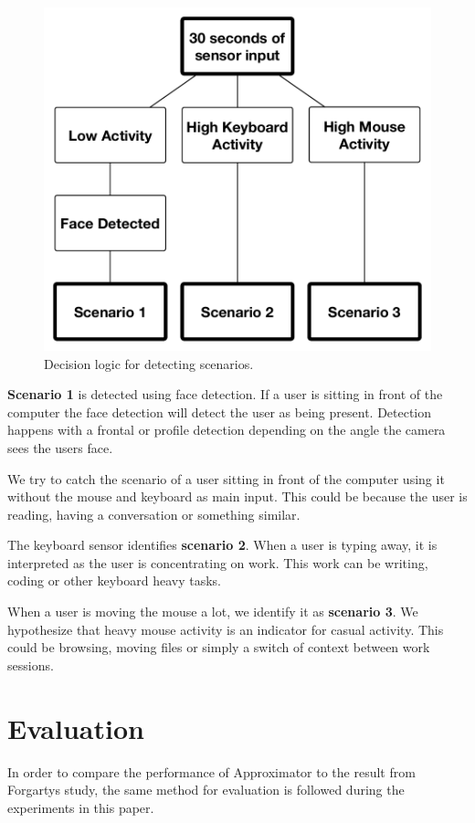 \documentclass{sigchi}
\begin{document}
\begin{figure}[H]
  \centering
  \includegraphics[width=\columnwidth]{figures/decision_logic.pdf}
  \caption{Decision logic for detecting scenarios.}
  \label{fig:decision_logic}
\end{figure}

\textbf{Scenario 1} is detected using face detection.
If a user is sitting in front of the computer the face detection will detect the user as being present.
Detection happens with a frontal or profile detection depending on the angle the camera sees the users face.

We try to catch the scenario of a user sitting in front of the computer using it without the mouse and keyboard as main input.
This could be because the user is reading, having a conversation or something similar.

The keyboard sensor identifies \textbf{scenario 2}.
When a user is typing away, it is interpreted as the user is concentrating on work.
This work can be writing, coding or other keyboard heavy tasks.

When a user is moving the mouse a lot, we identify it as \textbf{scenario 3}.
We hypothesize that heavy mouse activity is an indicator for casual activity.
This could be browsing, moving files or simply a switch of context between work sessions.


\section{Evaluation}
In order to compare the performance of Approximator to the result from Forgartys study, the same method for evaluation is followed during the experiments in this paper.
\end{document}
